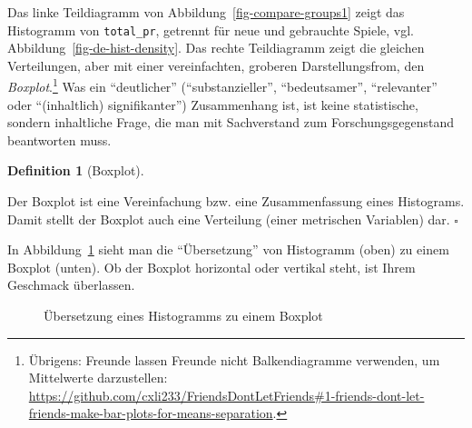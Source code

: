 \documentclass[
  letterpaper,
  oneside,
  open=any]{scrbook}
\theoremstyle{definition}
\theoremstyle{definition}
\theoremstyle{definition}
\newtheorem{definition}{Definition}[chapter]
\theoremstyle{remark}
\begin{document}
Das linke Teildiagramm von Abbildung~\ref{fig-compare-groups1} zeigt das
Histogramm von \texttt{total\_pr}, getrennt für neue und gebrauchte
Spiele, vgl. Abbildung~\ref{fig-de-hist-density}. Das rechte
Teildiagramm zeigt die gleichen Verteilungen, aber mit einer
vereinfachten, groberen Darstellungsfrom, den \emph{Boxplot}.\footnote{Übrigens:
  Freunde lassen Freunde nicht Balkendiagramme verwenden, um Mittelwerte
  darzustellen:
  \url{https://github.com/cxli233/FriendsDontLetFriends\#1-friends-dont-let-friends-make-bar-plots-for-means-separation}.}
Was ein \enquote{deutlicher} (\enquote{substanzieller},
\enquote{bedeutsamer}, \enquote{relevanter} oder \enquote{(inhaltlich)
signifikanter}) Zusammenhang ist, ist keine statistische, sondern
inhaltliche Frage, die man mit Sachverstand zum Forschungsgegenstand
beantworten muss.

\begin{definition}[Boxplot]\protect\hypertarget{def-boxplot}{}\label{def-boxplot}

Der Boxplot ist eine Vereinfachung bzw. eine Zusammenfassung eines
Histograms. Damit stellt der Boxplot auch eine Verteilung (einer
metrischen Variablen) dar. \(\square\)

\end{definition}

In Abbildung~\ref{fig-hist-to-box} sieht man die \enquote{Übersetzung}
von Histogramm (oben) zu einem Boxplot (unten). Ob der Boxplot
horizontal oder vertikal steht, ist Ihrem Geschmack überlassen.

\begin{figure}


\caption{\label{fig-hist-to-box}Übersetzung eines Histogramms zu einem
Boxplot}

\end{figure}%
\end{document}

